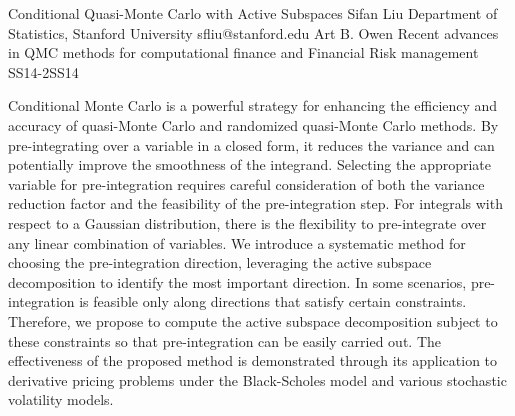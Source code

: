 \begin{talk}
  {Conditional Quasi-Monte Carlo with Active Subspaces}%
  {Sifan Liu}%
  {Department of Statistics, Stanford University}%
  {sfliu@stanford.edu}%
  {Art B. Owen}%
{Recent advances in QMC methods for computational finance and Financial Risk management}
{}{SS14-2}{SS14}

			



Conditional Monte Carlo is a powerful strategy for enhancing the efficiency and accuracy of quasi-Monte Carlo and randomized quasi-Monte Carlo methods. By pre-integrating over a variable in a closed form, it reduces the variance and can potentially improve the smoothness of the integrand. Selecting the appropriate variable for pre-integration requires careful consideration of both the variance reduction factor and the feasibility of the pre-integration step. For integrals with respect to a Gaussian distribution, there is the flexibility to pre-integrate over any linear combination of variables. We introduce a systematic method for choosing the pre-integration direction, leveraging the active subspace decomposition to identify the most important direction. In some scenarios, pre-integration is feasible only along directions that satisfy certain constraints. Therefore, we propose to compute the active subspace decomposition subject to these constraints so that pre-integration can be easily carried out. The effectiveness of the proposed method is demonstrated through its application to derivative pricing problems under the Black-Scholes model and various stochastic volatility models.














\end{talk}

